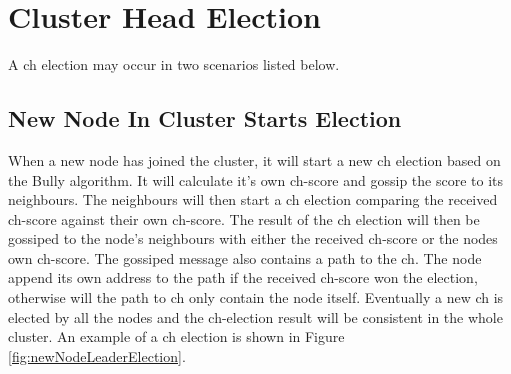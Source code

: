 \documentclass[USenglish]{uit-thesis}
\begin{document}
\newpage

\section{Cluster Head Election} \label{des:ch_election}
A \gls{ch} election may occur in two scenarios listed below.



\subsection{New Node In Cluster Starts Election}
When a new node has joined the cluster, it will start a new \gls{ch} election based on the Bully algorithm. It will calculate it's own \gls{ch}-score and gossip the score to its neighbours. The neighbours will then start a \gls{ch} election comparing the received \gls{ch}-score against their own \gls{ch}-score. The result of the \gls{ch} election will then be gossiped to the node's neighbours with either the received \gls{ch}-score or the nodes own \gls{ch}-score. The gossiped message also contains a path to the \gls{ch}. The node append its own address to the path if the received \gls{ch}-score won the election, otherwise will the path to \gls{ch} only contain the node itself. Eventually a new \gls{ch} is elected by all the nodes and the \gls{ch}-election result will be consistent in the whole cluster. An example of a \gls{ch} election is shown in Figure \ref{fig:newNodeLeaderElection}.
\end{document}
